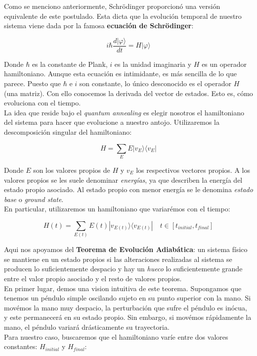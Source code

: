 \documentclass[11pt]{article}
\newcommand*{\ra}{\rangle}
\newcommand*{\la}{\langle}
\begin{document}
Como se menciono anteriormente, Schrödinger proporcionó una versión equivalente de este postulado. Esta dicta que la evolución temporal de nuestro sistema viene dada por la famosa \textbf{ecuación de Schrödinger}:

\[ i \hbar \frac{d|\varphi\ra}{dt} = H|\varphi\ra \]

Donde $\hbar$ es la constante de Plank, $i$ es la unidad imaginaria y $H$ es un operador hamiltoniano. Aunque esta ecuación es intimidante, es más sencilla de lo que parece. Puesto que $\hbar$ e $i$ son constante, lo único desconocido es el operador $H$ (una matriz). Con ello conocemos la derivada del vector de estados. Esto es, cómo evoluciona con el tiempo. \\

La idea que reside bajo el \emph{quantum annealing} es elegir nosotros el hamiltoniano del sistema para hacer que evolucione a nuestro antojo. Utilizaremos la descomposición singular del hamiltoniano:

\[ H = \sum_E E |v_E\ra\la v_E| \]

Donde $E$ son los valores propios de $H$ y $v_E$ los respectivos vectores propios. A los valores propios se les suele denominar \emph{energías}, ya que describen la energía del estado propio asociado. Al estado propio con menor energía se le denomina \emph{estado base} o \emph{ground state}. \\

En particular, utilizaremos un hamiltoniano que variarémos con el tiempo:

\[ H(t) = \sum_{E(t)} E(t) |v_{E(t)}\ra\la v_{E(t)}| \quad t \in [t_{initial}, t_{final}] \]

Aqui nos apoyamos del \textbf{Teorema de Evolución Adiabática}: un sistema físico se mantiene en un estado propios si las alteraciones realizadas al sistema se producen lo suficientemente despacio y hay un \emph{hueco} lo suficientemente grande entre el valor propio asociado y el resto de valores propios. \\

En primer lugar, demos una vision intuitiva de este teorema. Supongamos que tenemos un péndulo simple oscilando sujeto en su punto superior con la mano. Si movémos la mano muy despacio, la perturbación que sufre el péndulo es inócua, y este permanecerá en su estado propio. Sin embargo, si movémos rápidamente la mano, el péndulo variará drásticamente su trayectoria. \\

Para nuestro caso, buscaremos que el hamiltoniano varíe entre dos valores constantes: $H_{initial}$ y $H_{final}$:
\end{document}
